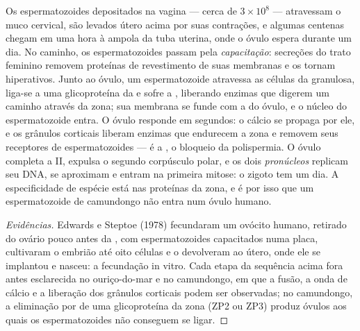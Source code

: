 \begin{proposition}\label{prop:b2:mammal-reproduction:fertilisation}
Os espermatozoides depositados na vagina --- cerca de $3\times 10^{8}$
--- atravessam o muco cervical, são levados útero acima por suas
contrações, e algumas centenas chegam em uma hora à ampola da tuba
uterina, onde o óvulo espera durante um dia. No caminho, os
espermatozoides passam pela \emph{capacitação}: secreções do trato
feminino removem proteínas de revestimento de suas membranas e os
tornam hiperativos. Junto ao óvulo, um espermatozoide atravessa as
células da granulosa, liga-se a uma glicoproteína da \emph{} e sofre a \emph{}, liberando enzimas que
digerem um caminho através da zona; sua membrana se funde com a do
óvulo, e o núcleo do espermatozoide entra. O óvulo responde em
segundos: o cálcio se propaga por ele, e os grânulos corticais liberam
enzimas que endurecem a zona e removem seus receptores de
espermatozoides --- é a \emph{}, o bloqueio da
polispermia. O óvulo completa a  II, expulsa o segundo corpúsculo
polar, e os dois \emph{pronúcleos}  replicam seu DNA, se
aproximam e entram na primeira mitose: o zigoto tem um dia. A
especificidade de espécie está nas proteínas da zona, e é por isso que
um espermatozoide de camundongo não entra num óvulo humano.
\end{proposition}
\begin{proof}[Evidências]
Edwards e Steptoe (1978) fecundaram um ovócito humano, retirado do
ovário pouco antes da , com espermatozoides capacitados numa
placa, cultivaram o embrião até oito células e o devolveram ao útero,
onde ele se implantou e nasceu: a fecundação in vitro. Cada etapa da
sequência acima fora antes esclarecida no ouriço-do-mar e no
camundongo, em que a fusão, a onda de cálcio e a liberação dos grânulos
corticais podem ser observadas; no camundongo, a eliminação por
 de uma glicoproteína da zona (ZP2 ou ZP3) produz óvulos aos
quais os espermatozoides não conseguem se ligar.
\end{proof}

